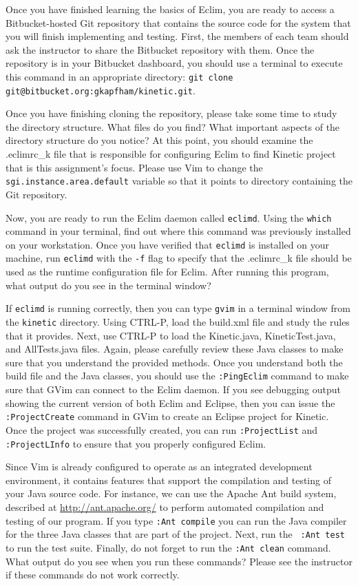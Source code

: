 Once you have finished learning the basics of Eclim, you are ready to access a Bitbucket-hosted Git repository that
contains the source code for the system that you will finish implementing and testing.  First, the members of each team
should ask the instructor to share the Bitbucket repository with them. Once the repository is in your Bitbucket
dashboard, you should use a terminal to execute this command in an appropriate directory: {\tt git clone
git@bitbucket.org:gkapfham/kinetic.git}.

Once you have finishing cloning the repository, please take some time to study the directory structure.  What files do
you find? What important aspects of the directory structure do you notice?  At this point, you should examine the
.eclimrc\_k file that is responsible for configuring Eclim to find Kinetic project that is this assignment's focus.
Please use Vim to change the {\tt sgi.instance.area.default} variable so that it points to directory containing the Git repository. 

Now, you are ready to run the Eclim daemon called {\tt eclimd}.  Using the {\tt which} command in your terminal, find
out where this command was previously installed on your workstation.  Once you have verified that {\tt eclimd} is
installed on your machine, run {\tt eclimd} with the {\tt -f} flag to specify that the .eclimrc\_k file should be used
as the runtime configuration file for Eclim.  After running this program, what output do you see in the terminal window?

If {\tt eclimd} is running correctly, then you can type {\tt gvim} in a terminal window from the {\tt kinetic}
directory. Using CTRL-P, load the build.xml file and study the rules that it provides.  Next, use CTRL-P to load the
Kinetic.java, KineticTest.java, and AllTests.java files.  Again, please carefully review these Java classes to make sure
that you understand the provided methods. Once you understand both the build file and the Java classes, you should 
use the {\tt :PingEclim} command to make sure that GVim can connect to the Eclim daemon.  If you see debugging output
showing the current version of both Eclim and Eclipse, then you can issue the {\tt :ProjectCreate} command in GVim to
create an Eclipse project for Kinetic.  Once the project was successfully created, you can run {\tt :ProjectList}
and {\tt :ProjectLInfo} to ensure that you properly configured Eclim. 
 
Since Vim is already configured to operate as an integrated development environment, it contains features that support
the compilation and testing of your Java source code.  For instance, we can use the Apache Ant build system, described
at \url{http://ant.apache.org/} to perform automated compilation and testing of our program. If you type {\tt :Ant
	compile} you can run the Java compiler for the three Java classes that are part of the project.  Next, run the {\tt
	:Ant test} to run the test suite.  Finally, do not forget to run the {\tt :Ant clean} command. What output do you
	see when you run these commands? Please see the instructor if these commands do not work correctly.

